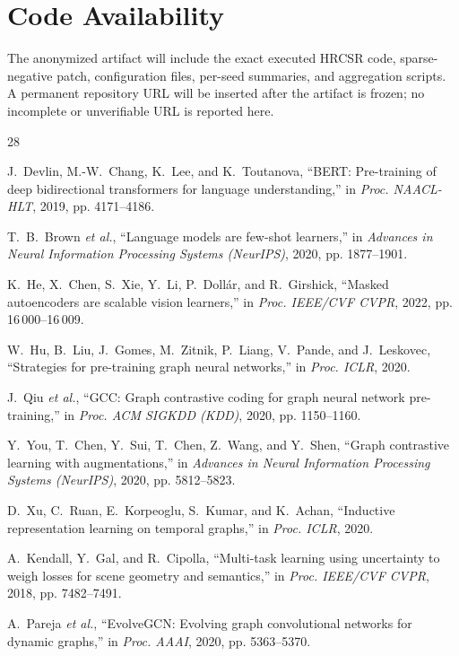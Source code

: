 \documentclass[journal]{IEEEtran}
\begin{document}
\FloatBarrier
\section*{Code Availability}
The anonymized artifact will include the exact executed HRCSR code, sparse-negative patch, configuration files, per-seed summaries, and aggregation scripts. A permanent repository URL will be inserted after the artifact is frozen; no incomplete or unverifiable URL is reported here.

\balance
\begin{thebibliography}{28}

		J.~Devlin, M.-W.~Chang, K.~Lee, and K.~Toutanova,
		``BERT: Pre-training of deep bidirectional transformers for language understanding,''
		in \emph{Proc. NAACL-HLT}, 2019, pp. 4171--4186.

		T.~B.~Brown \emph{et al.},
		``Language models are few-shot learners,''
		in \emph{Advances in Neural Information Processing Systems (NeurIPS)}, 2020, pp. 1877--1901.

		K.~He, X.~Chen, S.~Xie, Y.~Li, P.~Doll\'{a}r, and R.~Girshick,
		``Masked autoencoders are scalable vision learners,''
		in \emph{Proc. IEEE/CVF CVPR}, 2022, pp. 16\,000--16\,009.

		W.~Hu, B.~Liu, J.~Gomes, M.~Zitnik, P.~Liang, V.~Pande, and J.~Leskovec,
		``Strategies for pre-training graph neural networks,''
		in \emph{Proc. ICLR}, 2020.

		J.~Qiu \emph{et al.},
		``GCC: Graph contrastive coding for graph neural network pre-training,''
		in \emph{Proc. ACM SIGKDD (KDD)}, 2020, pp. 1150--1160.

		Y.~You, T.~Chen, Y.~Sui, T.~Chen, Z.~Wang, and Y.~Shen,
		``Graph contrastive learning with augmentations,''
		in \emph{Advances in Neural Information Processing Systems (NeurIPS)}, 2020, pp. 5812--5823.

		D.~Xu, C.~Ruan, E.~Korpeoglu, S.~Kumar, and K.~Achan,
		``Inductive representation learning on temporal graphs,''
		in \emph{Proc. ICLR}, 2020.

		A.~Kendall, Y.~Gal, and R.~Cipolla,
		``Multi-task learning using uncertainty to weigh losses for scene geometry and semantics,''
		in \emph{Proc. IEEE/CVF CVPR}, 2018, pp. 7482--7491.

		A.~Pareja \emph{et al.},
		``EvolveGCN: Evolving graph convolutional networks for dynamic graphs,''
		in \emph{Proc. AAAI}, 2020, pp. 5363--5370.


\end{thebibliography}
\end{document}
